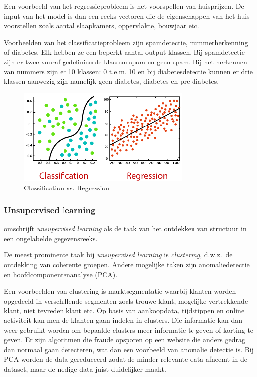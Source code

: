 Een voorbeeld van het regressieprobleem is het voorspellen van huisprijzen. De input van het model is dan een reeks vectoren die de eigenschappen van het huis voorstellen zoals aantal slaapkamers, oppervlakte, bouwjaar etc.

Voorbeelden van het classificatieprobleem zijn spamdetectie, nummerherkenning of diabetes. Elk hebben ze een beperkt aantal output klassen. Bij spamdetectie zijn er twee vooraf gedefinieerde klassen: spam en geen spam. Bij het herkennen van nummers zijn er 10 klassen: 0 t.e.m. 10 en bij diabetesdetectie kunnen er drie klassen aanwezig zijn namelijk geen diabetes, diabetes en pre-diabetes.

\begin{figure}
    \centering
    \includegraphics[width=0.75\textwidth]{./img/classification_regression.png}
    \caption{\label{fig:classification_vs_regression} Classification vs. Regression~\autocite{JavaTpoint2021}}
\end{figure}

\subsubsection{Unsupervised learning}
\textcite{Lievens2021} omschrijft \textit{unsupervised learning} als de taak van het ontdekken van structuur in een ongelabelde gegevensreeks.

De meest prominente taak bij \textit{unsupervised learning} is \textit{clustering}, d.w.z.\ de ontdekking van coherente
groepen. Andere mogelijke taken zijn anomaliedetectie en hoofdcomponentenanalyse (PCA).

Een voorbeelden van clustering is marktsegmentatie waarbij klanten worden opgedeeld in verschillende segmenten zoals trouwe klant, mogelijke vertrekkende klant, niet tevreden klant etc. Op basis van aankoopdata, tijdstippen en online activiteit kan men de klanten gaan indelen in clusters. Die informatie kan dan weer gebruikt worden om bepaalde clusters meer informatie te geven of korting te geven.
Er zijn algoritmen die fraude opsporen op een website die anders gedrag dan normaal gaan detecteren, wat dan een voorbeeld van anomalie detectie is.
Bij PCA worden de data gereduceerd zodat de minder relevante data afneemt in de dataset, maar de nodige data juist duidelijker maakt.


